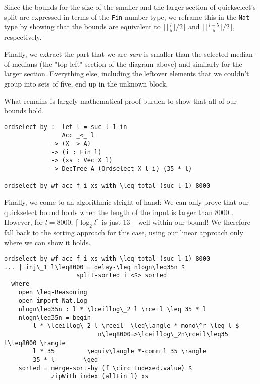 Since the bounds for the size of the smaller and the larger section of quickselect's split are expressed in terms of the \texttt{Fin} number type, we reframe this in the \texttt{Nat} type by showing that the bounds are equivalent to $\lfloor \lfloor \frac l 5 \rfloor / 2 \rfloor$ and $\lfloor \lfloor \frac {l - 5} 5 \rfloor / 2 \rfloor$, respectively.

Finally, we extract the part that we are \emph{sure} is smaller than the selected median-of-medians (the "top left" section of the diagram above) and similarly for the larger section. Everything else, including the leftover elements that we couldn't group into sets of five, end up in the unknown block.

What remains is largely mathematical proof burden to show that all of our bounds hold.

\begin{lstlisting}[caption={Quickselect},label={lst:median:quickselect},emph={ordselect,by}]
ordselect-by :  let l = suc l-1 in
                Acc _<_ l
             -> (X -> A)
             -> (i : Fin l)
             -> (xs : Vec X l)
             -> DecTree A (Ordselect X l i) (35 * l)

ordselect-by wf-acc f i xs with \leq-total (suc l-1) 8000
\end{lstlisting}

Finally, we come to an algorithmic sleight of hand: We can only prove that our quickselect bound holds when the length of the input is larger than 8000 . However, for $l = 8000$, $\lceil \log_2 l \rceil$ is just 13 -- well within our bound! We therefore fall back to the sorting approach for this case, using our linear approach only where we can show it holds.

\begin{lstlisting}[caption={Quickselect ($l \leq 8000$)},label={lst:median:quickselect:small},emph={ordselect,by,split,sorted,merge,sort}]
ordselect-by wf-acc f i xs with \leq-total (suc l-1) 8000
... | inj\_1 l\leq8000 = delay-\leq nlogn\leq35n $
                    split-sorted i <$> sorted
  where
    open \leq-Reasoning
    open import Nat.Log
    nlogn\leq35n : l * \lceillog\_2 l \rceil \leq 35 * l
    nlogn\leq35n = begin
        l * \lceillog\_2 l \rceil  \leq\langle *-mono\^r-\leq l $
                          n\leq8000=>\lceillog\_2n\rceil\leq35 l\leq8000 \rangle
        l * 35         \equiv\langle *-comm l 35 \rangle
        35 * l        \qed
    sorted = merge-sort-by (f \circ Indexed.value) $
             zipWith index (allFin l) xs
\end{lstlisting}

